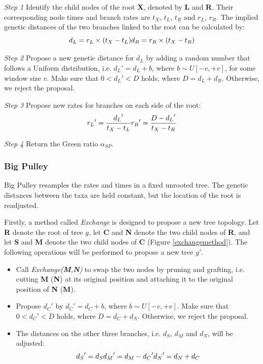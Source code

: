 \documentclass{bmcart}
\begin{document}
\emph{Step 1} Identify the child nodes of the root \textbf{X}, denoted by \textbf{L} and \textbf{R}. Their corresponding node times and branch rates are $t_X$, $t_L$, $t_R$ and $r_L$, $r_R$. The implied genetic distances of the two branches linked to the root can be calculated by:
\begin{equation}
\label{sma1_dis}
{d_L} = {r_L} \times ({{t_X} - {t_L}})\\
{d_R} = {r_R} \times ({{t_X} - {t_R}})
 \end{equation}

\emph{Step 2} Propose a new genetic distance for $d_L$ by adding a random number that follows a Uniform distribution, i.e.  ${d_L}' = {d_L} + b$, where $b \sim U[ - v, + v]$, for some window size $v$. Make sure that $0 < {d_L}' < D$ holds, where $D = {d_L} + {d_R}$. Otherwise, we reject the proposal.

\emph{Step 3} Propose new rates for branches on each side of the root:
\begin{equation}
\label{sma1_rate}
{r_L}' = \frac{{{d_L}'}}{{{t_X} - {t_L}}}\\
{r_R}' = \frac{{D - {d_L}'}}{{{t_X} - {t_R}}}
 \end{equation}

\emph{Step 4} Return the Green ratio ${\alpha_{SP}}$.
\subsubsection*{Big Pulley}
Big Pulley resamples the rates and times in a fixed unrooted tree. The genetic distances between the taxa are held constant, but the location of the root is readjusted.

Firstly, a method called \textit{Exchange} is designed to propose a new tree topology. Let \textbf{R} denote the root of tree $g$, let \textbf{C} and \textbf{N} denote the two child nodes of \textbf{R}, and let \textbf{S} and \textbf{M} denote the two child nodes of \textbf{C} (Figure \ref{exchangemethod}). The following operations will be performed to propose a new tree $g'$.
\begin{itemize}
\item Call \textit{Exchange(\textbf{M},\textbf{N})} to swap the two nodes by pruning and grafting, i.e. cutting \textbf{M} (\textbf{N}) at its original position and attaching it to the original position of \textbf{N} (\textbf{M}).
\item Propose ${d_C}'$ by ${d_C}' = {d_C} + b$, where $b \sim U[ - v, + v]$. Make sure that $0 < {d_C}' < D$ holds, where $D = {d_C} + {d_{N}}$. Otherwise, we reject the proposal. 
\item The distances on the other three branches, i.e. $d_S$, $d_{M}$ and $d_{N}$, will be adjusted:
\begin{equation}\label{big_dis}
{d_S}' = {d_S}\\
{d_{M}}' = {d_{M}} - {d_C}'\\
{d_{N}}' = {d_{N}} + {d_C}
\end{equation}
\end{itemize}
\end{document}
